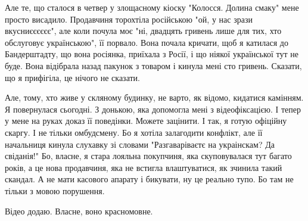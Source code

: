 Але те, що сталося в четвер у злощасному кіоску "Колосся. Долина смаку" мене
просто висадило. Продавчиня торохтіла російською "ой, у нас зрази
вкусниєєєєєє", але коли почула моє "ні, двадцять гривень лише для тих, хто
обслуговує українською", її порвало. Вона почала кричати, щоб я катилася до
Бандерштадту, що вона росіянка, приїхала з Росії, і що ніякої української тут
не буде. Вона відібрала назад пакунок з товаром і кинула мені сто гривень.
Сказати, що я прифігіла, це нічого не сказати.

Але, тому, хто живе у скляному будинку, не варто, як відомо, кидатися камінням.
Я повернулася сьогодні. З донькою, яка допомогла мені з відеофіксацією. І тепер
у мене на руках доказ її поведінки. Можете зацінити. І так, я готую офіційну
скаргу. І не тільки омбудсмену. Бо я хотіла залагодити конфлікт, але її
начальниця кинула слухавку зі словами "Разгаваріваєтє на украінскам? Да
свіданія!" Бо, власне, я стара лояльна покупчиня, яка скуповувалася тут багато
років, а це нова продавчиня, яка не встигла влаштуватися, як зчинила такий
скандал. А не мати касового апарату і бикувати, ну це реально тупо. Бо там не
тільки з мовою порушення.

Відео додаю. Власне, воно красномовне.

